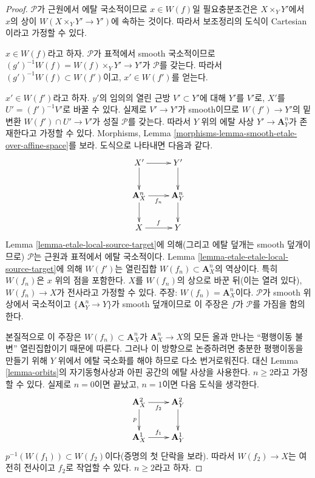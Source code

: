 \begin{proof}
$\mathcal{P}$가 근원에서 에탈 국소적이므로 $x \in W(f)$일
필요충분조건은 $X \times_Y Y'$에서 $x$의 상이
$W(X \times_Y Y' \to Y')$에 속하는 것이다. 따라서 보조정리의
도식이 Cartesian이라고 가정할 수 있다.

\medskip\noindent
$x \in W(f)$라고 하자. $\mathcal{P}$가 표적에서 smooth 국소적이므로
$(g')^{-1}W(f) = W(f) \times_Y Y' \to Y'$가 $\mathcal{P}$를 갖는다.
따라서 $(g')^{-1}W(f) \subset W(f')$이고, $x' \in W(f')$를 얻는다.

\medskip\noindent
$x' \in W(f')$라고 하자. $y'$의 임의의 열린 근방 $V' \subset Y'$에
대해 $Y'$를 $V'$로, $X'$를 $U' = (f')^{-1}V'$로 바꿀 수 있다.
실제로 $V' \to Y'$가 smooth이므로 $W(f') \to Y'$의 밑변환
$W(f') \cap U' \to V'$가 성질 $\mathcal{P}$를 갖는다. 따라서
$Y$ 위의 에탈 사상 $Y' \to \mathbf{A}^n_Y$가 존재한다고 가정할 수
있다. Morphisms, Lemma
\ref{morphisms-lemma-smooth-etale-over-affine-space}를 보라. 도식으로
나타내면 다음과 같다.
$$
\xymatrix{
X' \ar[r] \ar[d] & Y' \ar[d] \\
\mathbf{A}^n_X \ar[r]_{f_n} \ar[d] & \mathbf{A}^n_Y \ar[d] \\
X \ar[r]^f & Y
}
$$
Lemma \ref{lemma-etale-local-source-target}에 의해(그리고 에탈 덮개는
smooth 덮개이므로) $\mathcal{P}$는 근원과 표적에서 에탈 국소적이다.
Lemma \ref{lemma-etale-etale-local-source-target}에 의해 $W(f')$는
열린집합 $W(f_n) \subset \mathbf{A}^n_X$의 역상이다. 특히
$W(f_n)$은 $x$ 위의 점을 포함한다. $X$를 $W(f_n)$의 상으로
바꾼 뒤(이는 열려 있다), $W(f_n) \to X$가 전사라고 가정할 수 있다.
주장: $W(f_n) = \mathbf{A}^n_X$이다. $\mathcal{P}$가 smooth 위상에서
국소적이고 $\{\mathbf{A}^n_Y \to Y\}$가 smooth 덮개이므로 이 주장은
$f$가 $\mathcal{P}$를 가짐을 함의한다.

\medskip\noindent
본질적으로 이 주장은 $W(f_n) \subset \mathbf{A}^n_X$가
$\mathbf{A}^n_X \to X$의 모든 올과 만나는 ``평행이동 불변''
열린집합이기 때문에 따른다. 그러나 이 방향으로 논증하려면 충분한
평행이동을 만들기 위해 $Y$ 위에서 에탈 국소화를 해야 하므로 다소
번거로워진다. 대신 Lemma \ref{lemma-orbits}의 자기동형사상과 아핀
공간의 에탈 사상을 사용한다. $n \geq 2$라고 가정할 수 있다. 실제로
$n = 0$이면 끝났고, $n = 1$이면 다음 도식을 생각한다.
$$
\xymatrix{
\mathbf{A}^2_X \ar[r]_{f_2} \ar[d]_p & \mathbf{A}^2_Y \ar[d] \\
\mathbf{A}^1_X \ar[r]^{f_1} & \mathbf{A}^1_Y
}
$$
$p^{-1}(W(f_1)) \subset W(f_2)$이다(증명의 첫 단락을 보라).
따라서 $W(f_2) \to X$는 여전히 전사이고 $f_2$로 작업할 수 있다.
$n \geq 2$라고 하자.


\end{proof}
